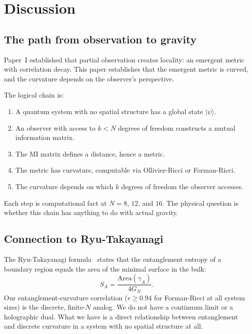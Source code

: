 \documentclass[aps,pra,twocolumn,superscriptaddress]{revtex4-2}
\begin{document}
\section{Discussion}
\label{sec:discussion}

\subsection{The path from observation to gravity}

Paper~I established that partial observation creates locality: an emergent metric with correlation decay. This paper establishes that the emergent metric is curved, and the curvature depends on the observer's perspective.

The logical chain is:
\begin{enumerate}
\item A quantum system with no spatial structure has a global state $|\psi\rangle$.
\item An observer with access to $k < N$ degrees of freedom constructs a mutual information matrix.
\item The MI matrix defines a distance, hence a metric.
\item The metric has curvature, computable via Ollivier-Ricci or Forman-Ricci.
\item The curvature depends on which $k$ degrees of freedom the observer accesses.
\end{enumerate}

Each step is computational fact at $N = 8$, $12$, and $16$. The physical question is whether this chain has anything to do with actual gravity.


\subsection{Connection to Ryu-Takayanagi}

The Ryu-Takayanagi formula~\cite{ryu2006} states that the entanglement entropy of a boundary region equals the area of the minimal surface in the bulk:
\begin{equation}
S_A = \frac{\text{Area}(\gamma_A)}{4 G_N}.
\end{equation}
Our entanglement-curvature correlation ($r \geq 0.94$ for Forman-Ricci at all system sizes) is the discrete, finite-$N$ analog. We do not have a continuum limit or a holographic dual. What we have is a direct relationship between entanglement and discrete curvature in a system with no spatial structure at all.
\end{document}
